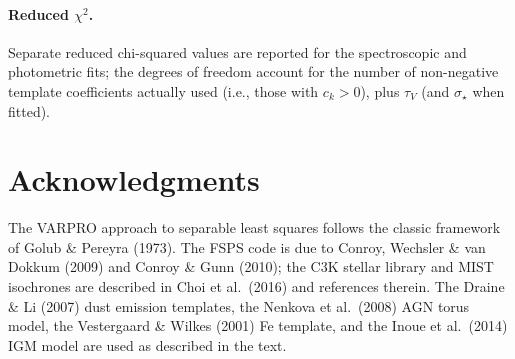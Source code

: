 \documentclass[12pt]{article}
\newcommand{\tauv}{\tau_{V}}
\newcommand{\vdisp}{\sigma_{\star}}
\begin{document}
\paragraph{Reduced $\chi^2$.}
Separate reduced chi-squared values are reported for the spectroscopic and
photometric fits; the degrees of freedom account for the number of non-negative
template coefficients actually used (i.e., those with $c_k > 0$), plus
$\tauv$ (and $\vdisp$ when fitted).


\section*{Acknowledgments}

The VARPRO approach to separable least squares follows the classic framework
of Golub \& Pereyra (1973).  The FSPS code is due to Conroy, Wechsler \&
van Dokkum (2009) and Conroy \& Gunn (2010); the C3K stellar library and
MIST isochrones are described in Choi et al.\ (2016) and references therein.
The Draine \& Li (2007) dust emission templates, the Nenkova et al.\ (2008)
AGN torus model, the Vestergaard \& Wilkes (2001) Fe template, and the
Inoue et al.\ (2014) IGM model are used as described in the text.
\end{document}
